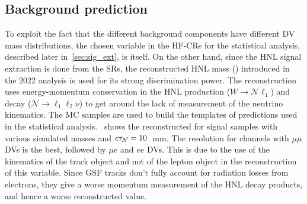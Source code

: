 \subsection{Background prediction}
To exploit the fact that the different background components have different DV mass distributions, the chosen variable  in the HF-CRs for the statistical analysis, described later in~\cref{sec:sig_ext}, is \mdv itself. On the other hand, since the HNL signal extraction is done from the SRs, the reconstructed HNL mass (\mhnl) introduced in the 2022 analysis is used for its strong discrimination power. The reconstruction uses energy-momentum conservation in the HNL production ($W\to\mathcal{N}\ell_1$) and decay ($\mathcal{N}\to\ell_1\ell_2\nu$) to get around the lack of measurement of the neutrino kinematics. The MC samples are used to build the templates of predictions used in the statistical analysis.~ shows the reconstructed \mhnl for signal samples with various simulated masses and $c\tau_\mathcal{N} = 10$~mm. The \mhnl resolution for channels with $\mu\mu$ DVs is the best, followed by $\mu e$ and $ee$ DVs. This is due to the use of the kinematics of the track object and not of the lepton object in the reconstruction of this variable. Since GSF tracks don't fully account for radiation losses from electrons, they give a worse momentum measurement of the HNL decay products, and hence a worse reconstructed \mhnl value.

